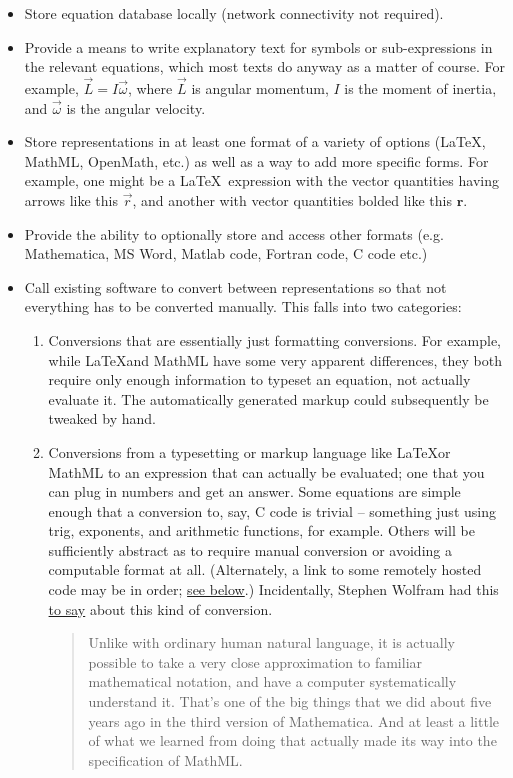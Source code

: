 \documentclass[12pt,letterpaper]{article}
\begin{document}
\begin{itemize}
\item Store equation database locally (network connectivity not required).
\item Provide a means to write explanatory text for symbols or sub-expressions in the relevant equations, which most texts do anyway as a matter of course. For example, $\vec{L} = I \vec{\omega}$, where $\vec{L}$ is angular momentum, $I$ is the moment of inertia, and $\vec{\omega}$ is the angular velocity.
\item Store representations in at least one format of a variety of options (\LaTeX, MathML, OpenMath, etc.) as well as a way to add more specific forms. For example, one might be a \LaTeX\ expression with the vector quantities having arrows like this $\vec{r}$, and another with vector quantities bolded like this $\mathbf{r}$.
\item Provide the ability to optionally store and access other formats (e.g. Mathematica, MS Word, Matlab code, Fortran code, C code etc.)
\item Call existing software to convert between representations so that not everything has to be converted manually. This falls into two categories:
\begin{enumerate}
\item Conversions that are essentially just formatting conversions. For example, while \LaTeX and MathML have some very apparent differences, they both require only enough information to typeset an equation, not actually evaluate it. The automatically generated markup could subsequently be tweaked by hand.
\item Conversions from a typesetting or markup language like \LaTeX or MathML to an expression that can actually be evaluated; one that you can plug in numbers and get an answer. Some equations are simple enough that a conversion to, say, C code is trivial -- something just using trig, exponents, and arithmetic functions, for example. Others will be sufficiently abstract as to require manual conversion or avoiding a computable format at all. (Alternately, a link to some remotely hosted code may be in order; \hyperref[linking]{see below}.) Incidentally, Stephen Wolfram had this \href{http://www.stephenwolfram.com/publications/recent/mathml/mathml1.html} {to say} about this kind of conversion.
\begin{quote}
Unlike with ordinary human natural language, it is actually possible to take a very close approximation to familiar mathematical notation, and have a computer systematically understand it. That's one of the big things that we did about five years ago in the third version of Mathematica. And at least a little of what we learned from doing that actually made its way into the specification of MathML. 

\end{quote}
\end{enumerate}
\end{itemize}
\end{document}
